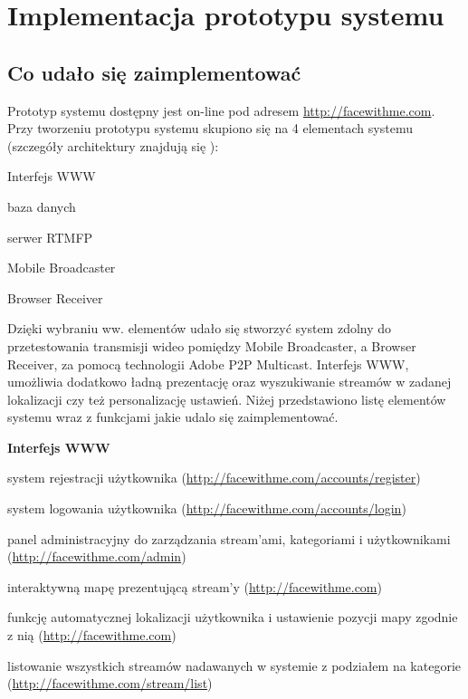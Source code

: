 \chapter{Implementacja prototypu systemu}
\label{cha:ImplementacjaPrototypu}

\section{Co udało się zaimplementować}

Prototyp systemu dostępny jest on-line pod adresem \url{http://facewithme.com}. Przy tworzeniu prototypu systemu skupiono się na 4 elementach systemu (szczegóły architektury znajdują się ):
\begin{packed_item}
    \item{Interfejs WWW}
    \item{baza danych}
    \item{serwer RTMFP}
    \item{Mobile Broadcaster}
    \item{Browser Receiver}
\end{packed_item}

Dzięki wybraniu ww. elementów udało się stworzyć system zdolny do przetestowania transmisji wideo pomiędzy Mobile Broadcaster, a Browser Receiver, za pomocą technologii Adobe P2P Multicast. Interfejs WWW, umożliwia dodatkowo ładną prezentację oraz wyszukiwanie streamów w zadanej lokalizacji czy też personalizację ustawień. Niżej przedstawiono listę elementów systemu wraz z funkcjami jakie udalo się zaimplementować.

\large{\textbf{Interfejs WWW}}
\begin{packed_item}
    \item{system rejestracji użytkownika (\url{http://facewithme.com/accounts/register})}



    \item{system logowania użytkownika (\url{http://facewithme.com/accounts/login})}
    \item{panel administracyjny do zarządzania stream'ami, kategoriami i użytkownikami (\url{http://facewithme.com/admin})}
    \item{interaktywną mapę prezentującą stream'y (\url{http://facewithme.com})}
    \item{funkcję automatycznej lokalizacji użytkownika i ustawienie pozycji mapy zgodnie z nią (\url{http://facewithme.com})}
    \item{listowanie wszystkich streamów nadawanych w systemie z podziałem na kategorie  (\url{http://facewithme.com/stream/list})}
\end{packed_item}

